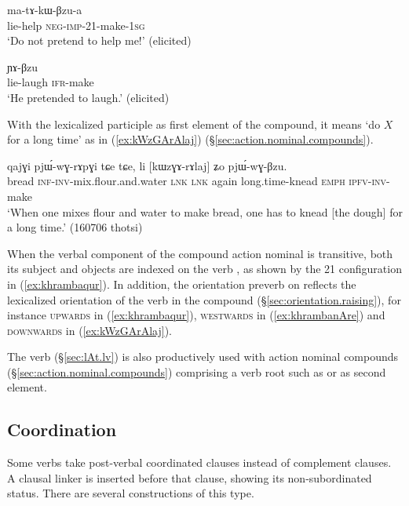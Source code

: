 \begin{exe}
	\ex \label{ex:khrambaqur}
	 ma-tɤ-kɯ-βzu-a \\
	lie-help \textsc{neg}-\textsc{imp}-2\fl{}1-make-\textsc{1sg} \\
	\glt `Do not pretend to help me!' (elicited)
\end{exe}

\begin{exe}
	\ex \label{ex:khrambanAre}
	 ɲɤ-βzu \\
	lie-laugh \textsc{ifr}-make \\
	\glt `He pretended to laugh.' (elicited)
\end{exe}

With the lexicalized participle  as first element of the compound, it means `do $X$ for a long time' as in (\ref{ex:kWzGArAlaj}) (§\ref{sec:action.nominal.compounds}). 

\begin{exe}
	\ex \label{ex:kWzGArAlaj}
	\gll qajɣi pjɯ́-wɣ-rɤpɣi tɕe tɕe, li [kɯzɣɤ-rɤlaj] ʑo pjɯ́-wɣ-βzu. \\
	bread \textsc{inf}-\textsc{inv}-mix.flour.and.water \textsc{lnk} \textsc{lnk} again long.time-knead \textsc{emph} \textsc{ipfv}-\textsc{inv}-make \\
	\glt `When one mixes flour and water to make bread, one has to knead [the dough] for a long time.' (160706 thotsi)
\end{exe}

When the verbal component of the compound action nominal is transitive, both its subject and objects are indexed on the verb , as shown by the 2\fl{}1 configuration in (\ref{ex:khrambaqur}). In addition, the orientation preverb on  reflects the lexicalized orientation of the verb in the compound (§\ref{sec:orientation.raising}), for instance \textsc{upwards} in (\ref{ex:khrambaqur}),  \textsc{westwards} in (\ref{ex:khrambanAre}) and \textsc{downwards} in (\ref{ex:kWzGArAlaj}).


The verb  (§\ref{sec:lAt.lv}) is also productively used with action nominal compounds (§\ref{sec:action.nominal.compounds}) comprising a verb root such as  or  as second element.


\subsection{Coordination} \label{sec:coordination.comp.str}
Some verbs take post-verbal coordinated clauses instead of complement clauses. A clausal linker is inserted before that clause, showing its non-subordinated status. There are several constructions of this type.

